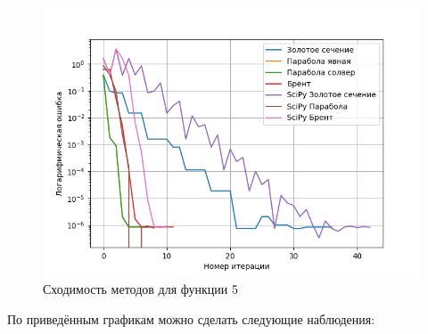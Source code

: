 \documentclass[a4paper,12pt]{article}
\begin{document}
\begin{figure}[H]
    \centering
    \begin{minipage}{0.49\textwidth}
        \centering \includegraphics[width=\textwidth]{images/task1/f5_with_scipy.png}
        \caption{Сходимость методов для функции 5}
    \end{minipage}
\end{figure}
По приведённым графикам можно сделать следующие наблюдения:
\end{document}
